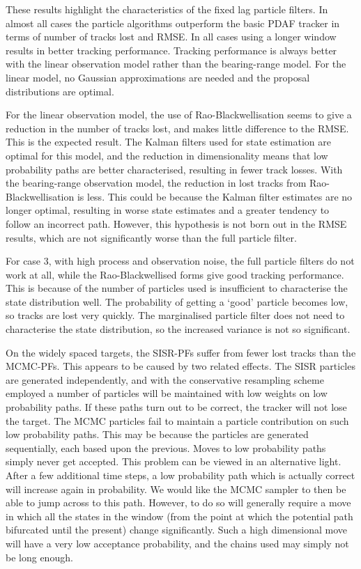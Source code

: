 These results highlight the characteristics of the fixed lag particle filters. In almost all cases the particle algorithms outperform the basic PDAF tracker in terms of number of tracks lost and RMSE. In all cases using a longer window results in better tracking performance. Tracking performance is always better with the linear observation model rather than the bearing-range model. For the linear model, no Gaussian approximations are needed and the proposal distributions are optimal.

For the linear observation model, the use of Rao-Blackwellisation seems to give a reduction in the number of tracks lost, and makes little difference to the RMSE. This is the expected result. The Kalman filters used for state estimation are optimal for this model, and the reduction in dimensionality means that low probability paths are better characterised, resulting in fewer track losses. With the bearing-range observation model, the reduction in lost tracks from Rao-Blackwellisation is less. This could be because the Kalman filter estimates are no longer optimal, resulting in worse state estimates and a greater tendency to follow an incorrect path. However, this hypothesis is not born out in the RMSE results, which are not significantly worse than the full particle filter.

For case 3, with high process and observation noise, the full particle filters do not work at all, while the Rao-Blackwellised forms give good tracking performance. This is because of the number of particles used is insufficient to characterise the state distribution well. The probability of getting a `good' particle becomes low, so tracks are lost very quickly. The marginalised particle filter does not need to characterise the state distribution, so the increased variance is not so significant.

On the widely spaced targets, the SISR-PFs suffer from fewer lost tracks than the MCMC-PFs. This appears to be caused by two related effects. The SISR particles are generated independently, and with the conservative resampling scheme employed a number of particles will be maintained with low weights on low probability paths. If these paths turn out to be correct, the tracker will not lose the target. The MCMC particles fail to maintain a particle contribution on such low probability paths. This may be because the particles are generated sequentially, each based upon the previous. Moves to low probability paths simply never get accepted. This problem can be viewed in an alternative light. After a few additional time steps, a low probability path which is actually correct will increase again in probability. We would like the MCMC sampler to then be able to jump across to this path. However, to do so will generally require a move in which all the states in the window (from the point at which the potential path bifurcated until the present) change significantly. Such a high dimensional move will have a very low acceptance probability, and the chains used may simply not be long enough.

